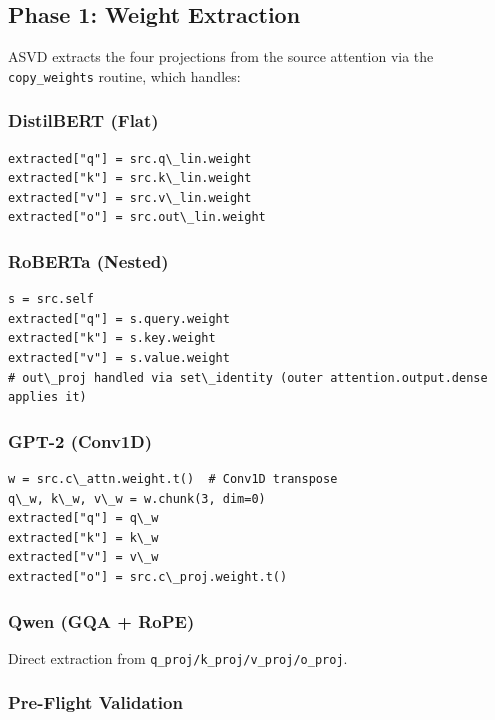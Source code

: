 \subsection{Phase 1: Weight Extraction}

ASVD extracts the four projections from the source attention via the 
\texttt{copy\_weights} routine, which handles:

\subsubsection{DistilBERT (Flat)}

\begin{lstlisting}
extracted["q"] = src.q\_lin.weight
extracted["k"] = src.k\_lin.weight
extracted["v"] = src.v\_lin.weight
extracted["o"] = src.out\_lin.weight
\end{lstlisting}

\subsubsection{RoBERTa (Nested)}

\begin{lstlisting}
s = src.self
extracted["q"] = s.query.weight
extracted["k"] = s.key.weight
extracted["v"] = s.value.weight
# out\_proj handled via set\_identity (outer attention.output.dense applies it)
\end{lstlisting}

\subsubsection{GPT-2 (Conv1D)}

\begin{lstlisting}
w = src.c\_attn.weight.t()  # Conv1D transpose
q\_w, k\_w, v\_w = w.chunk(3, dim=0)
extracted["q"] = q\_w
extracted["k"] = k\_w
extracted["v"] = v\_w
extracted["o"] = src.c\_proj.weight.t()
\end{lstlisting}

\subsubsection{Qwen (GQA + RoPE)}

Direct extraction from \texttt{q\_proj/k\_proj/v\_proj/o\_proj}.

\subsubsection{Pre-Flight Validation}

